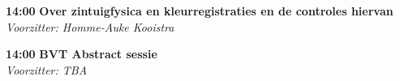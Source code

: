 \documentclass[a4paper,10pt]{report}
\begin{document}
\begin{multicols*}{3}
\begin{packed_enum}
\item[\textbf{14:00}] \textbf{Over zintuigfysica en kleurregistraties en de controles hiervan}\\\textit{Voorzitter: Homme-Auke Kooistra}
\end{packed_enum}


\begin{packed_enum}
\item[\textbf{14:00}]\textbf{BVT Abstract sessie}\\\textit{Voorzitter: TBA}
\end{packed_enum}
 

\end{multicols*}
\end{document}
